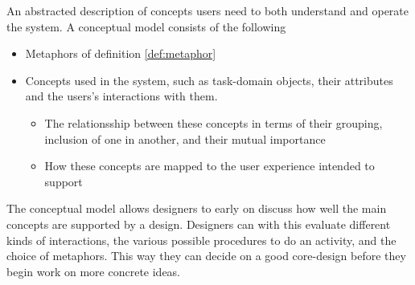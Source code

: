 \begin{concept} \label{conc:conceptual_model} 
  An abstracted description of concepts users need to both understand and operate the system. A conceptual model consists of the following
  \begin{itemize}
    \item Metaphors of definition \ref{def:metaphor}
    \item Concepts used in the system, such as task-domain objects, their attributes and the users's interactions with them. 
      \begin{itemize}
      \item The relationsship between these concepts in terms of their grouping, inclusion of one in another, and their mutual importance
      \item How these concepts are mapped to the user experience intended to support
      \end{itemize}
  \end{itemize}
  The conceptual model allows designers to early on discuss how well the main concepts are supported by a design. Designers can with this evaluate different kinds of interactions, the various possible procedures to do an activity, and the choice of metaphors. This way they can decide on a good core-design before they begin work on more concrete ideas. \cite[p. 40-41]{rogers}
\end{concept}
